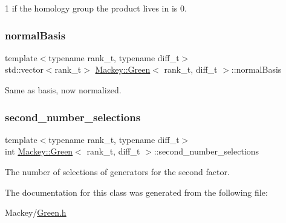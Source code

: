 1 if the homology group the product lives in is 0. 

\mbox{\label{classMackey_1_1Green_a18135b4b1a4aceb387519832a487206a}} 
\subsubsection{\texorpdfstring{normal\+Basis}{normalBasis}}
{\footnotesize\ttfamily template$<$typename rank\+\_\+t, typename diff\+\_\+t$>$ \\
std\+::vector$<$rank\+\_\+t$>$ \hyperlink{classMackey_1_1Green}{Mackey\+::\+Green}$<$ rank\+\_\+t, diff\+\_\+t $>$\+::normal\+Basis}



Same as basis, now normalized. 

\mbox{\label{classMackey_1_1Green_a1240acdc0e901e496597eab2d0ef27f2}} 
\subsubsection{\texorpdfstring{second\+\_\+number\+\_\+selections}{second\_number\_selections}}
{\footnotesize\ttfamily template$<$typename rank\+\_\+t, typename diff\+\_\+t$>$ \\
int \hyperlink{classMackey_1_1Green}{Mackey\+::\+Green}$<$ rank\+\_\+t, diff\+\_\+t $>$\+::second\+\_\+number\+\_\+selections}



The number of selections of generators for the second factor. 



The documentation for this class was generated from the following file\+:\begin{DoxyCompactItemize}
\item 
Mackey/\hyperlink{Green_8h}{Green.\+h}\end{DoxyCompactItemize}
